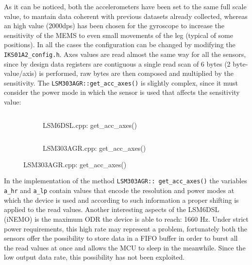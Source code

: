 As it can be noticed, both the accelerometers have been set to the same full scale value, to mantain data coherent with previous datasets already collected, whereas an high value (2000dps) has been chosen for the gyroscope to increase the sensitivity of the MEMS to even small movements of the leg (typical of some positions). In all the cases the configuration can be changed by modifying the \texttt{IKS01A2_config.h}.\newline
Axes values are read almost the same way for all the sensors, since by design data registers are contiguous a single read scan of 6 bytes (2 byte-value/axis) is performed, raw bytes are then composed and multiplied by the sensitivity. The \texttt{LSM303AGR::get_acc_axes()} is slightly complex, since it must consider the power mode in which the sensor is used that affects the sensitivity value:
\begin{center}
	\begin{figure}[H]
		\begin{subfigure}[H]{0.5\textwidth}
			\inputminted[framesep=1.5cm, firstline=101, lastline=127, bgcolor=whitesmoke, fontsize=\tiny]{C++}{code/data_gathering.cpp}
			\vspace{-20pt}
			\caption{LSM6DSL.cpp: get\_acc\_axes()}\label{fig:6a}
		\end{subfigure}
		\hfill
		\begin{subfigure}[H]{0.5\textwidth}
			\vspace{+1pt}
			\inputminted[framesep=1.5cm, firstline=149, lastline=189, bgcolor=whitesmoke, fontsize=\tiny]{C++}{code/data_gathering.cpp}
			\vspace{-20pt}
			\caption{LSM303AGR.cpp: get\_acc\_axes()}\label{fig:6b}
		\end{subfigure}
	\end{figure}
\end{center}
 In the implementation of the method \texttt{LSM303AGR:: get_acc_axes()} the variables \texttt{a_hr} and \texttt{a_lp} contain values that encode the resolution and power modes at which the device is used and according to such information a proper shifting is applied to the read values.\newline
 Another interesting aspects of the LSM6DSL (iNEMO) is the maximum ODR the device is able to reach: 1660 Hz. Under strict power requirements, this high rate may represent a problem, fortunately both the sensors offer the possibility to store data in a FIFO  buffer in order to burst all the read values at once and allows the MCU to sleep in the meanwhile. Since the low output data rate, this possibility has not been exploited.
 \newpage 
